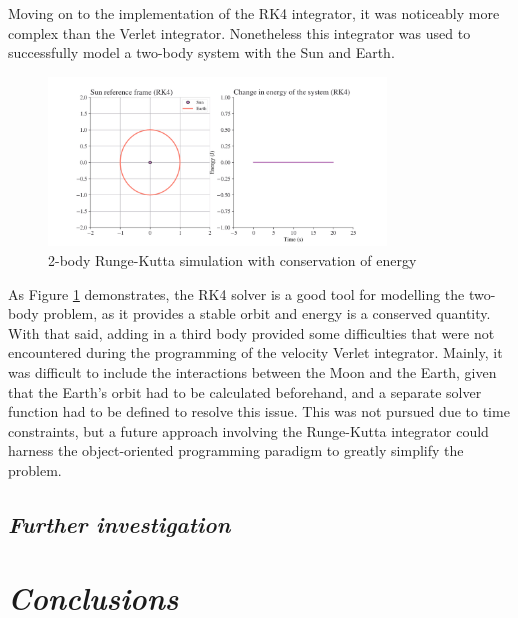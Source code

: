 \documentclass[12pt, english]{report}
\begin{document}
\normalsize{Moving on to the implementation of the RK4 integrator, it was noticeably more complex than the Verlet integrator. Nonetheless this integrator was used to successfully model a two-body system with the Sun and Earth.}
\begin{figure}[ht]
    \centering
    \includegraphics[width=0.8\textwidth]{graphics/rk4.png}
    \caption{2-body Runge-Kutta simulation with conservation of energy}
    \label{fig:rk4}
\end{figure}
\normalsize{
As Figure \ref{fig:rk4} demonstrates, the RK4 solver is a good tool for modelling the two-body problem, as it provides a stable orbit and energy is a conserved quantity. With that said, adding in a third body provided some difficulties that were not encountered during the programming of the velocity Verlet integrator. Mainly, it was difficult to include the interactions between the Moon and the Earth, given that the Earth's orbit had to be calculated beforehand, and a separate solver function had to be defined to resolve this issue. This was not pursued due to time constraints, but a future approach involving the Runge-Kutta integrator could harness the object-oriented programming paradigm to greatly simplify the problem.}

\section{\textsl{Further investigation}}



%

\chapter{\textsl{Conclusions}}

%

\newpage


\end{document}
